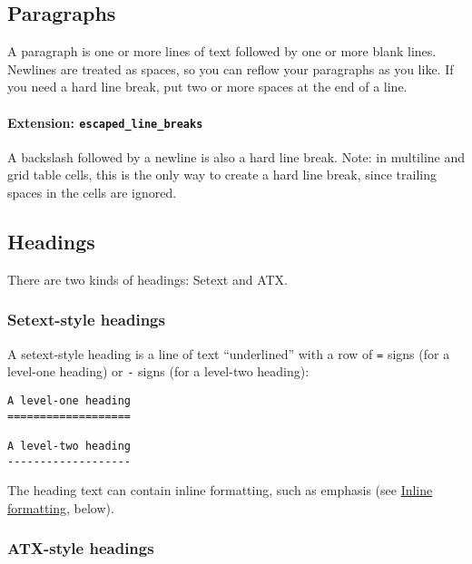 \documentclass[
  a4paper,
]{article}
\begin{document}
\hypertarget{paragraphs}{%
\subsection{Paragraphs}\label{paragraphs}}

A paragraph is one or more lines of text followed by one or more blank
lines. Newlines are treated as spaces, so you can reflow your paragraphs
as you like. If you need a hard line break, put two or more spaces at
the end of a line.

\hypertarget{extension-escaped_line_breaks}{%
\paragraph{\texorpdfstring{Extension:
\texttt{escaped\_line\_breaks}}{Extension: escaped\_line\_breaks}}\label{extension-escaped_line_breaks}}

A backslash followed by a newline is also a hard line break. Note: in
multiline and grid table cells, this is the only way to create a hard
line break, since trailing spaces in the cells are ignored.

\hypertarget{headings}{%
\subsection{Headings}\label{headings}}

There are two kinds of headings: Setext and ATX.

\hypertarget{setext-style-headings}{%
\subsubsection{Setext-style headings}\label{setext-style-headings}}

A setext-style heading is a line of text ``underlined'' with a row of
\texttt{=} signs (for a level-one heading) or \texttt{-} signs (for a
level-two heading):

\begin{verbatim}
A level-one heading
===================

A level-two heading
-------------------
\end{verbatim}

The heading text can contain inline formatting, such as emphasis (see
\protect\hyperlink{inline-formatting}{Inline formatting}, below).

\hypertarget{atx-style-headings}{%
\subsubsection{ATX-style headings}\label{atx-style-headings}}
\end{document}
